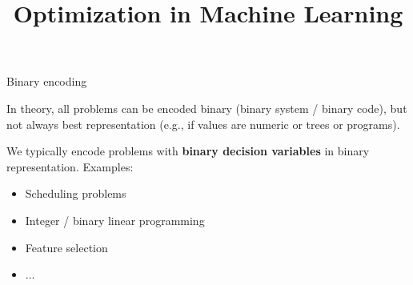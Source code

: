 \documentclass[11pt,compress,t,notes=noshow, xcolor=table]{beamer}
\title{Optimization in Machine Learning}
\date{}
\begin{document}
\sloppy

\begin{vbframe}{Binary encoding}

    In theory, all problems can be encoded binary (binary system / binary code), but not always best representation (e.g., if values are numeric or trees or programs). 
    
    \lz 

    We typically encode problems with \textbf{binary decision variables} in binary representation. Examples:
    \begin{itemize}
        \item Scheduling problems
        \item Integer / binary linear programming
        \item Feature selection 
        \item ... 
    \end{itemize}
    
\end{vbframe}
\end{document}
